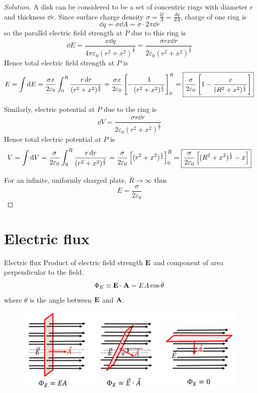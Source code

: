 \begin{proof}[Solution]
A disk can be considered to be a set of concentric rings with diameter $r$ and thickness $\dd{r}$. Since surface charge density $\sigma=\frac{Q}{A}=\frac{dq}{dA}$, charge of one ring is
\[ \dd{q} = \sigma\dd{A} = \sigma\cdot2\pi\dd{r} \]
so the parallel electric field strength at $P$ due to this ring is 
\[ \dd{E} = \frac{x\dd{q}}{4\pi\varepsilon_0(r^2+x^2)^\frac{3}{2}} = \frac{\sigma rx\dd{r}}{2\varepsilon_0(r^2+x^2)^\frac{3}{2}} \]
Hence total electric field strength at $P$ is
\[ E = \int\dd{E} = \frac{\sigma x}{2\varepsilon_0} \int_0^R\frac{r\dd{r}}{(r^2+x^2)^\frac{3}{2}} = \frac{\sigma x}{2\varepsilon_0} \left[-\frac{1}{(r^2+x^2)^\frac{1}{2}}\right]_0^R = \boxed{\frac{\sigma}{2\varepsilon_0}\left[1-\frac{x}{(R^2+x^2)^\frac{1}{2}}\right]} \]

Similarly, electric potential at $P$ due to the ring is 
\[ \dd{V} = \frac{\sigma r\dd{r}}{2\varepsilon_0(r^2+x^2)^\frac{1}{2}} \]
Hence total electric potential at $P$ is
\[ V = \int\dd{V} = \frac{\sigma}{2\varepsilon_0}\int_0^R\frac{r\dd{r}}{(r^2+x^2)^\frac{1}{2}} = \frac{\sigma}{2\varepsilon_0}\left[(r^2+x^2)^\frac{1}{2}\right]_0^R = \boxed{\frac{\sigma}{2\varepsilon_0}\left[(R^2+x^2)^\frac{1}{2}-x\right]} \]

For an infinite, uniformly charged plate, $R\to\infty$ thus
\[ \boxed{E = \frac{\sigma}{2\varepsilon_0}} \]
\end{proof}
\pagebreak

\section{Electric flux}
\begin{defn}{Electric flux}{}
Product of electric field strength $\vb{E}$ and component of area perpendicular to the field.
\begin{equation}
{\Phi_E \equiv \vb{E} \cdot \vb{A} = EA\cos\theta
}\end{equation}
where $\theta$ is the angle between $\vb{E}$ and $\vb{A}$.
\end{defn}

\begin{figure}[H]
    \centering
    \includegraphics[width=12cm]{images/eflux.png}
\end{figure}


